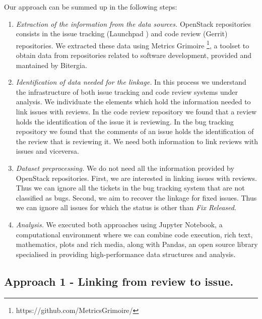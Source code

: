 \documentclass[conference,compsoc]{IEEEtran}
\begin{document}
Our approach can be summed up in the following steps:
\\
\begin{enumerate}
\item \emph{Extraction of the information from the data sources.}
OpenStack repositories consists in the
issue tracking (Launchpad ) and code review (Gerrit) 
repositories. We extracted these
data using Metrics Grimoire \footnote{https://github.com/MetricsGrimoire/}, 
a toolset to obtain data from repositories related to software development, 
provided and mantained by Bitergia.
\item \emph{Identification of data needed for the linkage.} In this process we 
understand the infrastructure of both issue 
tracking and code review systems under analysis. 
We individuate the elements which hold the 
information needed to link issues with reviews. 
In the code review repository we found that a review 
holds the identification of the issue it is reviewing. 
In the bug tracking repository we found that the comments of an issue holds the 
identification of the review that is reviewing it. 
We need both information to link reviews with issues and viceversa.
\item \emph{Dataset preprocessing.} We do not need all the information 
provided by OpenStack repositories.
First, we are interested in linking issues with reviews. Thus we can ignore all 
the tickets in the bug tracking system that are not classified as bugs. 
Second, we aim to recover the linkage for fixed issues. Thus we can 
ignore all issues for which the status is other than \emph{Fix Released}.   
\item \emph{Analysis.} We executed both approaches using Jupyter Notebook, a computational 
environment where we can combine code execution, rich text, 
mathematics, plots and rich media, along with Pandas, an open source library 
specialised in providing high-performance data structures and analysis. 
\end{enumerate}

\subsection{Approach 1 - Linking from review to issue.}
\end{document}
